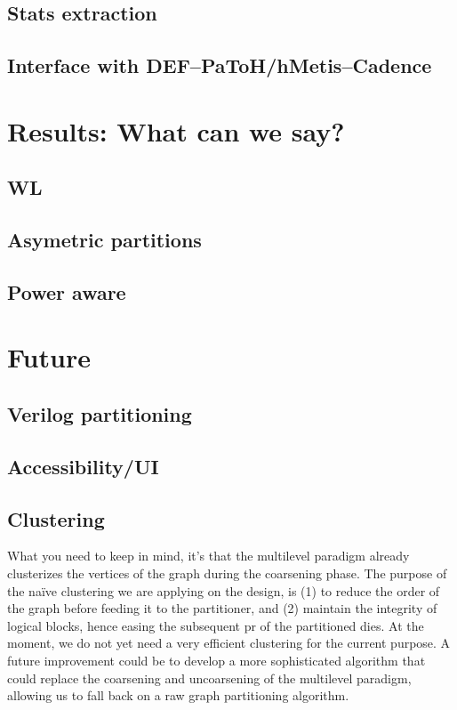 \documentclass[12pt,a4paper]{article}
\theoremstyle{customdef}
\begin{document}
\subsection{Stats extraction}
\subsection{Interface with DEF--PaToH/hMetis--Cadence}


\section{Results: What can we say?}
\subsection{WL}
\subsection{Asymetric partitions}
\subsection{Power aware}

\section{Future}
\subsection{Verilog partitioning}
\subsection{Accessibility/UI}
\subsection{Clustering}
What you need to keep in mind, it's that the multilevel paradigm already clusterizes the vertices of the graph during the coarsening phase.
The purpose of the naïve clustering we are applying on the design, is (1) to reduce the order of the graph before feeding it to the partitioner, and (2) maintain the integrity of logical blocks, hence easing the subsequent \gls{pr} of the partitioned dies.
At the moment, we do not yet need a very efficient clustering for the current purpose.
A future improvement could be to develop a more sophisticated algorithm that could replace the coarsening and uncoarsening of the multilevel paradigm, allowing us to fall back on a raw graph partitioning algorithm.
\end{document}
